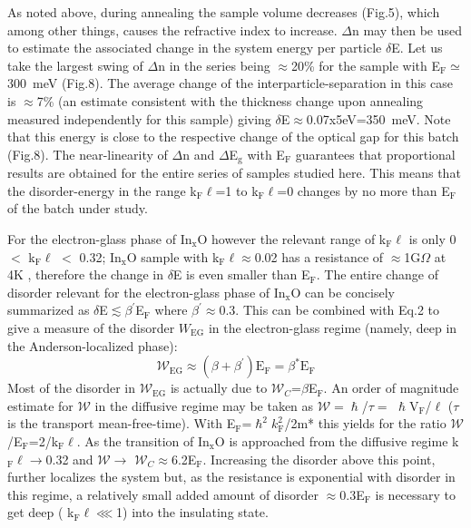 \documentclass
[preprint,showpacs,byrevtex,10pt,twocolumn,tightenlines,prl,letterpaper]{revtex4}%
\begin{document}
As noted above, during annealing the sample volume decreases (Fig.5), which
among other things, causes the refractive index to increase. $\Delta$n may
then be used to estimate the associated change in the system energy per
particle $\delta$E. Let us take the largest swing of $\Delta$n in the series
being $\approx$20\% for the sample with E$_{\text{F}}\simeq$300~meV (Fig.8).
The average change of the interparticle-separation in this case is $\approx
$7\% {\small (an estimate consistent with the thickness change upon annealing
measured independently for this sample)} giving $\delta$E$\approx
$0.07x5eV=350~meV. Note that this energy is close to the respective change of
the optical gap for this batch (Fig.8). The near-linearity of $\Delta$n and
$\Delta$E$_{\text{g}}$ with E$_{\text{F}}$ guarantees that proportional
results are obtained for the entire series of samples studied here. This means
that the disorder-energy in the range k$_{\text{F}}\ell$=1 to k$_{\text{F}%
}\ell$=0 changes by no more than E$_{\text{F}}$ of the batch under study.

For the electron-glass phase of In$_{\text{x}}$O however the relevant range of
k$_{\text{F}}\ell$ is only 0%
$<$%
k$_{\text{F}}\ell$%
$<$%
0.32; In$_{\text{x}}$O sample with k$_{\text{F}}\ell\approx$0.02 has a
resistance of $\approx$1G$\Omega$ at 4K \cite{24}, therefore the change in
$\delta$E is even smaller than E$_{\text{F}}$. The entire change of disorder
relevant for the electron-glass phase of In$_{\text{x}}$O can be concisely
summarized as $\delta$E$\lesssim\beta^{\prime}$E$_{\text{F}}$ where
$\beta^{\prime}\approx$0.3. {\small This can be combined with Eq.2 to give a
measure of the disorder }$W_{\text{EG}}$ {\small in the electron-glass regime
(namely, deep in the Anderson-localized phase):}%
\begin{equation}
\mathcal{W}_{\text{EG}}\approx(\beta+\beta^{\prime})\text{E}_{\text{F}}%
=\beta^{\ast}\text{E}_{\text{F}}%
\end{equation}
Most of the disorder in $\mathcal{W}_{\text{EG}}$ is actually due to
$\mathcal{W}_{C}$=$\beta$E$_{\text{F}}$. An order of magnitude estimate for
$\mathcal{W}$ in the diffusive regime may be taken as $\mathcal{W=}\hslash
$/$\tau=$ $\hslash$V$_{\text{F}}$/$\ell$ ($\tau$ is the transport
mean-free-time). With E$_{\text{F}}$=$\hslash^{\text{2}}k_{\text{F}}%
^{\text{2}}$/2m* this yields for the ratio $\mathcal{W}$/E$_{\text{F}}%
$=2/k$_{\text{F}}\ell$. As the transition of In$_{\text{x}}$O is approached
from the diffusive regime k$_{\text{F}}\ell\rightarrow$0.32 and
$\mathcal{W\rightarrow}$ $\mathcal{W}_{C}\approx$6.2E$_{\text{F}}$. Increasing
the disorder above this point, further localizes the system but, as the
resistance is exponential with disorder in this regime, a relatively small
added amount of disorder $\approx$0.3E$_{\text{F}}$ is necessary to get deep (
k$_{\text{F}}\ell\lll$1) into the insulating state.
\end{document}
